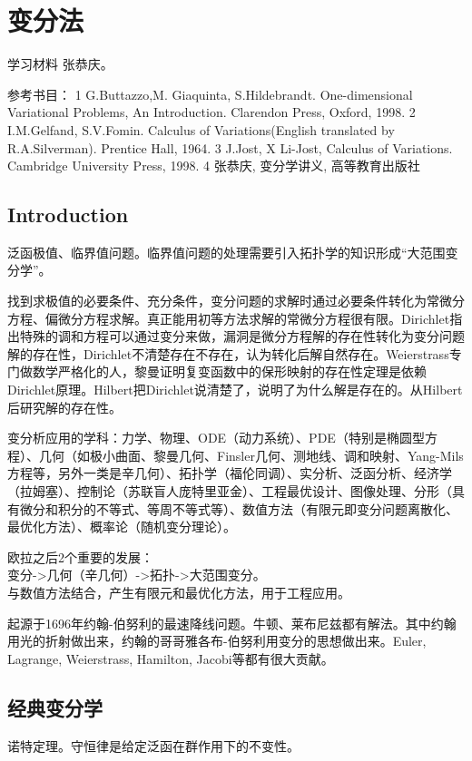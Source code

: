 \documentclass[UTF8]{../09-Mathematics}
\begin{document}
\section{变分法}
学习材料 张恭庆。

参考书目：
1 G.Buttazzo,M. Giaquinta, S.Hildebrandt. One-dimensional Variational Problems, An Introduction. Clarendon Press, Oxford, 1998.
2 I.M.Gelfand, S.V.Fomin. Calculus of Variations(English translated by R.A.Silverman). Prentice Hall, 1964.
3 J.Jost, X Li-Jost, Calculus of Variations. Cambridge University Press, 1998.
4 张恭庆, 变分学讲义, 高等教育出版社

\subsection{Introduction}
泛函极值、临界值问题。临界值问题的处理需要引入拓扑学的知识形成“大范围变分学”。

找到求极值的必要条件、充分条件，变分问题的求解时通过必要条件转化为常微分方程、偏微分方程求解。真正能用初等方法求解的常微分方程很有限。Dirichlet指出特殊的调和方程可以通过变分来做，漏洞是微分方程解的存在性转化为变分问题解的存在性，Dirichlet不清楚存在不存在，认为转化后解自然存在。Weierstrass专门做数学严格化的人，黎曼证明复变函数中的保形映射的存在性定理是依赖Dirichlet原理。Hilbert把Dirichlet说清楚了，说明了为什么解是存在的。从Hilbert后研究解的存在性。

变分析应用的学科：力学、物理、ODE（动力系统）、PDE（特别是椭圆型方程）、几何（如极小曲面、黎曼几何、Finsler几何、测地线、调和映射、Yang-Mils方程等，另外一类是辛几何）、拓扑学（福伦同调）、实分析、泛函分析、经济学（拉姆塞）、控制论（苏联盲人庞特里亚金）、工程最优设计、图像处理、分形（具有微分和积分的不等式、等周不等式等）、数值方法（有限元即变分问题离散化、最优化方法）、概率论（随机变分理论）。

欧拉之后2个重要的发展：\\
变分->几何（辛几何）->拓扑->大范围变分。\\
与数值方法结合，产生有限元和最优化方法，用于工程应用。


起源于1696年约翰-伯努利的最速降线问题。牛顿、莱布尼兹都有解法。其中约翰用光的折射做出来，约翰的哥哥雅各布-伯努利用变分的思想做出来。Euler, Lagrange, Weierstrass, Hamilton, Jacobi等都有很大贡献。

\subsection{经典变分学}

诺特定理。守恒律是给定泛函在群作用下的不变性。
\end{document}
